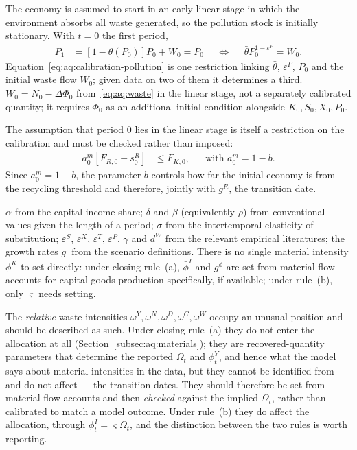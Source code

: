  The economy is assumed to start in an early linear stage in which the environment absorbs all waste generated, so the pollution stock is initially stationary. With $t=0$ the first period,
\begin{align}
P_1 &= \left[1-\theta(P_0)\right]P_0+W_0 = P_0
&&\Longleftrightarrow&&
\bar\theta P_0^{1-\varepsilon^P} = W_0.
\label{eq:aq:calibration-pollution}
\end{align}
Equation~\eqref{eq:aq:calibration-pollution} is one restriction linking $\bar\theta$, $\varepsilon^P$, $P_0$ and the initial waste flow $W_0$; given data on two of them it determines a third. $W_0=N_0-\Delta\Phi_0$ from~\eqref{eq:aq:waste} in the linear stage, not a separately calibrated quantity; it requires $\Phi_0$ as an additional initial condition alongside $K_0,S_0,X_0,P_0$.

 The assumption that period $0$ lies in the linear stage is itself a restriction on the calibration and must be checked rather than imposed:
\begin{align}
a^m_0\left[F_{R,0}+s^R_0\right] &\le F_{K,0},
&&\text{with }a^m_0=1-b.
\label{eq:aq:calibration-linear}
\end{align}
Since $a^m_0=1-b$, the parameter $b$ controls how far the initial economy is from the recycling threshold and therefore, jointly with $g^R$, the transition date.

 $\alpha$ from the capital income share; $\delta$ and $\beta$ (equivalently $\rho$) from conventional values given the length of a period; $\sigma$ from the intertemporal elasticity of substitution; $\varepsilon^S$, $\varepsilon^X$, $\varepsilon^T$, $\varepsilon^P$, $\gamma$ and $d^W$ from the relevant empirical literatures; the growth rates $g^\cdot$ from the scenario definitions. There is no single material intensity $\phi^K$ to set directly: under closing rule~(a), $\bar\phi^I$ and $g^\phi$ are set from material-flow accounts for capital-goods production specifically, if available; under rule~(b), only $\varsigma$ needs setting.

The \emph{relative} waste intensities $\omega^Y,\omega^N,\omega^D,\omega^C,\omega^W$ occupy an unusual position and should be described as such. Under closing rule~(a) they do not enter the allocation at all (Section~\ref{subsec:aq:materials}); they are recovered-quantity parameters that determine the reported $\Omega_t$ and $\phi^Y_t$, and hence what the model says about material intensities in the data, but they cannot be identified from --- and do not affect --- the transition dates. They should therefore be set from material-flow accounts and then \emph{checked} against the implied $\Omega_t$, rather than calibrated to match a model outcome. Under rule~(b) they do affect the allocation, through $\phi^I_t=\varsigma\Omega_t$, and the distinction between the two rules is worth reporting.

